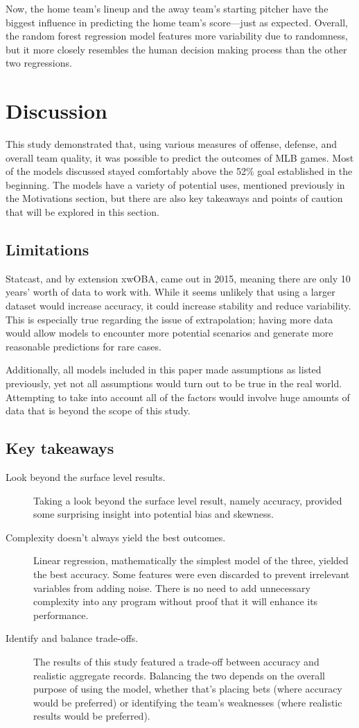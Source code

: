 \documentclass{paper}
\begin{document}
Now, the home team's lineup and the away team's starting pitcher have the biggest influence in predicting the home team's score---just as expected. Overall, the random forest regression model features more variability due to randomness, but it more closely resembles the human decision making process than the other two regressions.

\section{Discussion}
This study demonstrated that, using various measures of offense, defense, and overall team quality, it was possible to predict the outcomes of MLB games. Most of the models discussed stayed comfortably above the 52\% goal established in the beginning. The models have a variety of potential uses, mentioned previously in the Motivations section, but there are also key takeaways and points of caution that will be explored in this section.

\subsection{Limitations}
Statcast, and by extension xwOBA, came out in 2015, meaning there are only 10 years' worth of data to work with. While it seems unlikely that using a larger dataset would increase accuracy, it could increase stability and reduce variability. This is especially true regarding the issue of extrapolation; having more data would allow models to encounter more potential scenarios and generate more reasonable predictions for rare cases.

Additionally, all models included in this paper made assumptions as listed previously, yet not all assumptions would turn out to be true in the real world. Attempting to take into account all of the factors would involve huge amounts of data that is beyond the scope of this study.

\subsection{Key takeaways}
\begin{description}
\item[Look beyond the surface level results.] Taking a look beyond the surface level result, namely accuracy, provided some surprising insight into potential bias and skewness.
\item[Complexity doesn't always yield the best outcomes.] Linear regression, mathematically the simplest model of the three, yielded the best accuracy. Some features were even discarded to prevent irrelevant variables from adding noise. There is no need to add unnecessary complexity into any program without proof that it will enhance its performance.
\item[Identify and balance trade-offs.] The results of this study featured a trade-off between accuracy and realistic aggregate records. Balancing the two depends on the overall purpose of using the model, whether that's placing bets (where accuracy would be preferred) or identifying the team's weaknesses (where realistic results would be preferred).
\end{description}
\end{document}
